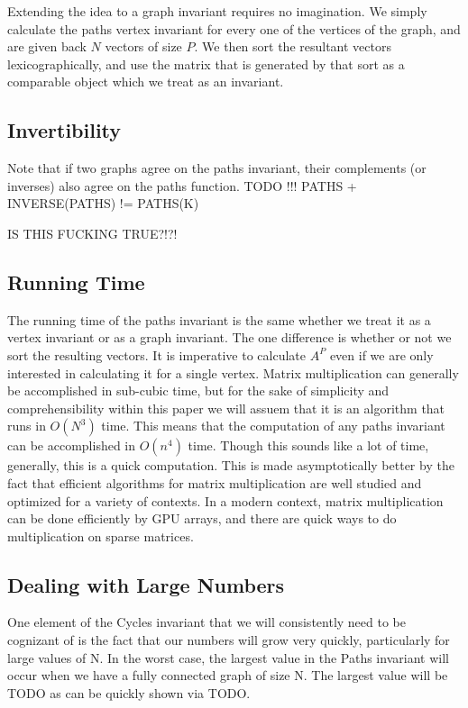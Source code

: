 \documentclass[11pt,a4paper]{report}
\begin{document}
Extending the idea to a graph invariant requires no imagination. 
We simply calculate the paths vertex invariant for every one of the vertices of the graph, and are given back $N$  vectors of size $P$.
We then sort the resultant vectors lexicographically, and use the matrix that is generated by that sort as a comparable object which we treat as an invariant.

\subsection{Invertibility}
Note that if two graphs agree on the paths invariant, their complements (or inverses) also agree on the paths function.
TODO !!! PATHS + INVERSE(PATHS) != PATHS(K)

IS THIS FUCKING TRUE?!?!

\subsection{Running Time}
The running time of the paths invariant is the same whether we treat it as a vertex invariant or as a graph invariant.
The one difference is whether or not we sort the resulting vectors.
It is imperative to calculate $A^P$ even if we are only interested in calculating it for a single vertex.
Matrix multiplication can generally be accomplished in sub-cubic time, but for the sake of simplicity and comprehensibility within this paper we will assuem that it is an algorithm that runs in $O(N^3)$  time.
This means that the computation of any paths invariant can be accomplished in $O(n^4)$ time.
Though this sounds like a lot of time, generally, this is a quick computation.
This is made asymptotically better by the fact that efficient algorithms for matrix multiplication are well studied and optimized for a variety of contexts.
In a modern context, matrix multiplication can be done efficiently by GPU arrays, and there are quick ways to do multiplication on sparse matrices.

\subsection{Dealing with Large Numbers}
One element of the Cycles invariant that we will consistently need to be cognizant of is the fact that our numbers will grow very quickly, particularly for large values of N.
In the worst case, the largest value in the Paths invariant will occur when we have a fully connected graph of size N.
The largest value will be TODO as can be quickly shown via TODO.
\end{document}
